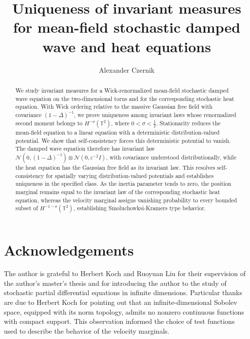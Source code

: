 \documentclass[11pt,a4paper]{amsart}
\title[Uniqueness of invariant measures]
  {Uniqueness of invariant measures for mean-field stochastic damped wave and heat equations}
\author{Alexander Czernik}
\date{}
\numberwithin{equation}{section}
\theoremstyle{plain}
\theoremstyle{definition}
\theoremstyle{remark}
\begin{document}
\begin{abstract}
We study invariant measures for a Wick-renormalized mean-field stochastic damped wave equation on the two-dimensional torus and for the corresponding stochastic heat equation. With Wick ordering relative to the massive Gaussian free field with covariance \((1-\Delta)^{-1}\), we prove uniqueness among invariant laws whose renormalized second moment belongs to \(H^{-\sigma}(\mathbb T^2)\), where \(0<\sigma<\tfrac12\). Stationarity reduces the mean-field equation to a linear equation with a deterministic distribution-valued potential. We show that self-consistency forces this deterministic potential to vanish. The damped wave equation therefore has invariant law \(\mathcal N(0,(1-\Delta)^{-1})\otimes\mathcal N(0,\varepsilon^{-2}I)\), with covariance understood distributionally, while the heat equation has the Gaussian free field as its invariant law. This resolves self-consistency for spatially varying distribution-valued potentials and establishes uniqueness in the specified class.
As the inertia parameter tends to zero, the position marginal remains equal to the invariant law of the corresponding stochastic heat equation, whereas the velocity marginal assigns vanishing probability to every bounded subset of \(H^{-1-\sigma}(\mathbb T^2)\), establishing Smoluchowksi-Kramers type behavior. 
\end{abstract}

\maketitle



\appendix


\section*{Acknowledgements}
The author is grateful to Herbert Koch and Ruoyuan Liu for their supervision of the author's master's thesis and for introducing the author to the study of stochastic partial differential equations in infinite dimensions. Particular thanks are due to Herbert Koch for pointing out that an infinite-dimensional Sobolev space, equipped with its norm topology, admits no nonzero continuous functions with compact support. This observation informed the choice of test functions used to describe the behavior of the velocity marginals.
\end{document}
